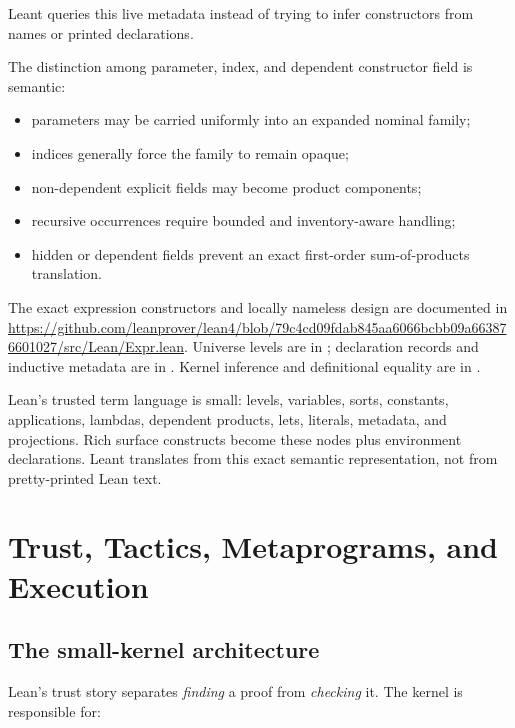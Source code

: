 \documentclass[10pt,letterpaper,oneside,openany]{report}
\begin{document}
Leant queries this live metadata instead of trying to infer constructors from names or printed declarations.

The distinction among parameter, index, and dependent constructor field is semantic:

\begin{itemize}
\item parameters may be carried uniformly into an expanded nominal family;
\item indices generally force the family to remain opaque;
\item non-dependent explicit fields may become product components;
\item recursive occurrences require bounded and inventory-aware handling;
\item hidden or dependent fields prevent an exact first-order sum-of-products translation.
\end{itemize}

\begin{sourcebox}
The exact expression constructors and locally nameless design are documented in \url{https://github.com/leanprover/lean4/blob/79c4cd09fdab845aa6066bcbb09a663876601027/src/Lean/Expr.lean}.  Universe levels are in ; declaration records and inductive metadata are in .  Kernel inference and definitional equality are in .
\end{sourcebox}

\begin{recapbox}
Lean's trusted term language is small: levels, variables, sorts, constants, applications, lambdas, dependent products, lets, literals, metadata, and projections.  Rich surface constructs become these nodes plus environment declarations.  Leant translates from this exact semantic representation, not from pretty-printed Lean text.
\end{recapbox}

\chapter{Trust, Tactics, Metaprograms, and Execution}\label{ch:trust}

\section{The small-kernel architecture}

Lean's trust story separates \emph{finding} a proof from \emph{checking} it.  The kernel is responsible for:
\end{document}
